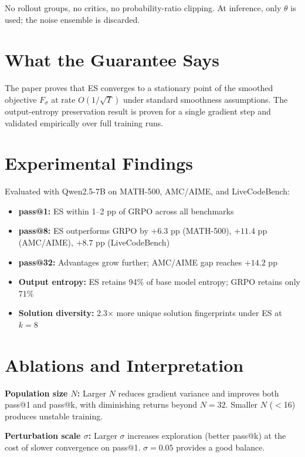 \documentclass[10pt,twocolumn]{article}
\begin{document}
No rollout groups, no critics, no probability-ratio clipping.
At inference, only $\theta$ is used; the noise ensemble is discarded.

\section{What the Guarantee Says}

The paper proves that ES converges to a stationary point of the
smoothed objective $F_\sigma$ at rate $O(1/\sqrt{T})$ under standard
smoothness assumptions. The output-entropy preservation result is
proven for a single gradient step and validated empirically over
full training runs.

\section{Experimental Findings}

Evaluated with Qwen2.5-7B on MATH-500, AMC/AIME, and LiveCodeBench:

\begin{itemize}[itemsep=2pt,parsep=0pt]
  \item \textbf{pass@1:} ES within 1--2 pp of GRPO across all benchmarks
  \item \textbf{pass@8:} ES outperforms GRPO by $+6.3$ pp (MATH-500),
    $+11.4$ pp (AMC/AIME), $+8.7$ pp (LiveCodeBench)
  \item \textbf{pass@32:} Advantages grow further; AMC/AIME gap reaches
    $+14.2$ pp
  \item \textbf{Output entropy:} ES retains 94\% of base model entropy;
    GRPO retains only 71\%
  \item \textbf{Solution diversity:} 2.3$\times$ more unique solution
    fingerprints under ES at $k{=}8$
\end{itemize}

\section{Ablations and Interpretation}

\textbf{Population size $N$:} Larger $N$ reduces gradient variance
and improves both pass@1 and pass@k, with diminishing returns beyond
$N{=}32$. Smaller $N$ ($<$16) produces unstable training.

\textbf{Perturbation scale $\sigma$:} Larger $\sigma$ increases
exploration (better pass@k) at the cost of slower convergence on
pass@1. $\sigma{=}0.05$ provides a good balance.
\end{document}

